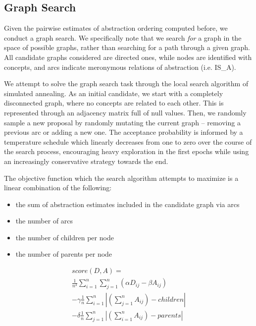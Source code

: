\subsection{Graph Search}

Given the pairwise estimates of abstraction ordering computed before, we conduct a graph search. We specifically note that we search \textit{for} a graph in the space of possible graphs, rather than searching for a path through a given graph. All candidate graphs considered are directed ones, while nodes are identified with concepts, and arcs indicate meronymous relations of abstraction (i.e. IS\_A).

We attempt to solve the graph search task through the local search algorithm of simulated annealing. As an initial candidate, we start with a completely disconnected graph, where no concepts are related to each other. This is represented through an adjacency matrix full of null values. Then, we randomly sample a new proposal by randomly mutating the current graph -- removing a previous arc or adding a new one. The acceptance probability is informed by a temperature schedule which linearly decreases from one to zero over the course of the search process, encouraging heavy exploration in the first epochs while using an increasingly conservative strategy towards the end.

The objective function which the search algorithm attempts to maximize is a linear combination of the following:

\begin{itemize}
    \item the sum of abstraction estimates included in the candidate graph via arcs
    \item the number of arcs
    \item the number of children per node
    \item the number of parents per node
\end{itemize}

\begin{align*}
    score(D, A) = \\
        \frac{1}{n^2} \sum_{i=1}^{n} \sum_{j=1}^{n} (\alpha D_{ij} - \beta A_{ij}) \\
    - \gamma \frac{1}{n} \sum_{i=1}^{n} \left|(\sum_{j=1}^{n}A_{ij}) - children\right| \\
    - \delta \frac{1}{n} \sum_{j=1}^{n} \left|(\sum_{i=1}^{n}A_{ij}) - parents\right|
\end{align*}

